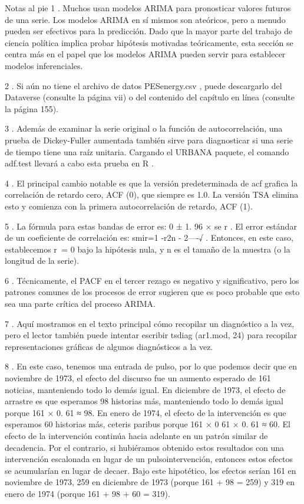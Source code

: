 \documentclass[
]{book}
\begin{document}
Notas al pie
1 .
Muchos usan modelos ARIMA para pronosticar valores futuros de una serie. Los modelos ARIMA en sí mismos son ateóricos, pero a menudo pueden ser efectivos para la predicción. Dado que la mayor parte del trabajo de ciencia política implica probar hipótesis motivadas teóricamente, esta sección se centra más en el papel que los modelos ARIMA pueden servir para establecer modelos inferenciales.

2 .
Si aún no tiene el archivo de datos PESenergy.csv , puede descargarlo del Dataverse (consulte la página vii) o del contenido del capítulo en línea (consulte la página 155).

3 .
Además de examinar la serie original o la función de autocorrelación, una prueba de Dickey-Fuller aumentada también sirve para diagnosticar si una serie de tiempo tiene una raíz unitaria. Cargando el URBANA paquete, el comando adf.test llevará a cabo esta prueba en R .

4 .
El principal cambio notable es que la versión predeterminada de acf grafica la correlación de retardo cero, ACF (0), que siempre es 1.0. La versión TSA elimina esto y comienza con la primera autocorrelación de retardo, ACF (1).

5 .
La fórmula para estas bandas de error es: 0 ± 1. 96 × se r . El error estándar de un coeficiente de correlación es: smir=1 -r2n - 2----√ . Entonces, en este caso, establecemos r  = 0 bajo la hipótesis nula, y n es el tamaño de la muestra (o la longitud de la serie).

6 .
Técnicamente, el PACF en el tercer rezago es negativo y significativo, pero los patrones comunes de los procesos de error sugieren que es poco probable que esto sea una parte crítica del proceso ARIMA.

7 .
Aquí mostramos en el texto principal cómo recopilar un diagnóstico a la vez, pero el lector también puede intentar escribir tsdiag (ar1.mod, 24) para recopilar representaciones gráficas de algunos diagnósticos a la vez.

8 .
En este caso, tenemos una entrada de pulso, por lo que podemos decir que en noviembre de 1973, el efecto del discurso fue un aumento esperado de 161 noticias, manteniendo todo lo demás igual. En diciembre de 1973, el efecto de arrastre es que esperamos 98 historias más, manteniendo todo lo demás igual porque 161 × 0. 61 ≈ 98. En enero de 1974, el efecto de la intervención es que esperamos 60 historias más, ceteris paribus porque 161 × 0 61 × 0. 61 ≈ 60. El efecto de la intervención continúa hacia adelante en un patrón similar de decadencia. Por el contrario, si hubiéramos obtenido estos resultados con una intervención escalonada en lugar de un pulsointervención, entonces estos efectos se acumularían en lugar de decaer. Bajo este hipotético, los efectos serían 161 en noviembre de 1973, 259 en diciembre de 1973 (porque 161 + 98 = 259) y 319 en enero de 1974 (porque 161 + 98 + 60 = 319).
\end{document}

